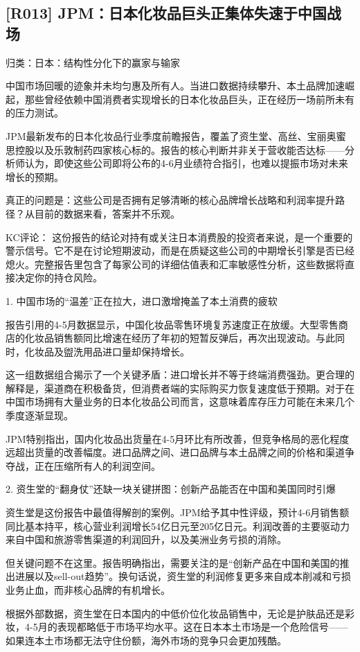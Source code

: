 \documentclass[11pt]{ctexart}
\begin{document}
\subsection{[R013] JPM：日本化妆品巨头正集体失速于中国战场}
{\small\color{refgray}归类：日本：结构性分化下的赢家与输家}

中国市场回暖的迹象并未均匀惠及所有人。当进口数据持续攀升、本土品牌加速崛起，那些曾经依赖中国消费者实现增长的日本化妆品巨头，正在经历一场前所未有的压力测试。

JPM最新发布的日本化妆品行业季度前瞻报告，覆盖了资生堂、高丝、宝丽奥蜜思控股以及乐敦制药四家核心标的。报告的核心判断并非关于营收能否达标——分析师认为，即使这些公司即将公布的4-6月业绩符合指引，也难以提振市场对未来增长的预期。

真正的问题是：这些公司是否拥有足够清晰的核心品牌增长战略和利润率提升路径？从目前的数据来看，答案并不乐观。

KC评论： 这份报告的结论对持有或关注日本消费股的投资者来说，是一个重要的警示信号。它不是在讨论短期波动，而是在质疑这些公司的中期增长引擎是否已经熄火。完整报告里包含了每家公司的详细估值表和汇率敏感性分析，这些数据将直接决定你的持仓风险。

1. 中国市场的“温差”正在拉大，进口激增掩盖了本土消费的疲软

报告引用的4-5月数据显示，中国化妆品零售环境复苏速度正在放缓。大型零售商店的化妆品销售额同比增速在经历了年初的短暂反弹后，再次出现波动。与此同时，化妆品及盥洗用品进口量却保持增长。

这一组数据组合揭示了一个关键矛盾：进口增长并不等于终端消费强劲。更合理的解释是，渠道商在积极备货，但消费者端的实际购买力恢复速度低于预期。对于在中国市场拥有大量业务的日本化妆品公司而言，这意味着库存压力可能在未来几个季度逐渐显现。

JPM特别指出，国内化妆品出货量在4-5月环比有所改善，但竞争格局的恶化程度远超出货量的改善幅度。进口品牌之间、进口品牌与本土品牌之间的价格和渠道争夺战，正在压缩所有人的利润空间。

2. 资生堂的“翻身仗”还缺一块关键拼图：创新产品能否在中国和美国同时引爆

资生堂是这份报告中最值得解剖的案例。JPM给予其中性评级，预计4-6月销售额同比基本持平，核心营业利润增长54亿日元至205亿日元。利润改善的主要驱动力来自中国和旅游零售渠道的利润回升，以及美洲业务亏损的消除。

但关键问题不在这里。报告明确指出，需要关注的是“创新产品在中国和美国的推出进展以及sell-out趋势”。换句话说，资生堂的利润修复更多来自成本削减和亏损业务止血，而非核心品牌的有机增长。

根据外部数据，资生堂在日本国内的中低价位化妆品销售中，无论是护肤品还是彩妆，4-5月的表现都略低于市场平均水平。这在日本本土市场是一个危险信号——如果连本土市场都无法守住份额，海外市场的竞争只会更加残酷。
\end{document}
